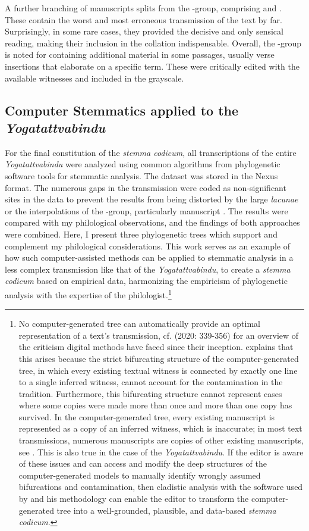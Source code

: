 A further branching of manuscripts splits from the \beta-group, comprising  and . These contain the worst and most erroneous transmission of the text by far. Surprisingly, in some rare cases, they provided the decisive and only sensical reading, making their inclusion in the collation indispensable. Overall, the \beta-group is noted for containing additional material in some passages, usually verse insertions that elaborate on a specific term. These were critically edited with the available witnesses and included in the grayscale.

\subsection{Computer Stemmatics applied to the \textit{Yogatattvabindu}}

For the final constitution of the \textit{stemma codicum}, all transcriptions of the entire \emph{Yogatattvabindu} were analyzed using common algorithms from phylogenetic software tools for stemmatic analysis. The dataset was stored in the Nexus format. The numerous gaps in the transmission were coded as non-significant sites in the data to prevent the results from being distorted by the large \textit{lacunae} or the interpolations of the \beta-group, particularly manuscript . The results were compared with my philological observations, and the findings of both approaches were combined. Here, I present three phylogenetic trees which support and complement my philological considerations. This work serves as an example of how such computer-assisted methods can be applied to stemmatic analysis in a less complex transmission like that of the \emph{Yogatattvabindu}, to create a \textit{stemma codicum} based on empirical data, harmonizing the empiricism of phylogenetic analysis with the expertise of the philologist.\footnote{No computer-generated tree can automatically provide an optimal representation of a text's transmission, cf. \citeauthor{baptiste2020} (2020: 339-356) for an overview of the criticism digital methods have faced since their inception. \citeauthor{maas2009stemma} explains that this arises because the strict bifurcating structure of the computer-generated tree, in which every existing textual witness is connected by exactly one line to a single inferred witness, cannot account for the contamination in the tradition. Furthermore, this bifurcating structure cannot represent cases where some copies were made more than once and more than one copy has survived. In the computer-generated tree, every existing manuscript is represented as a copy of an inferred witness, which is inaccurate; in most text transmissions, numerous manuscripts are copies of other existing manuscripts, see \citeauthor[2009: 80]{maas2009stemma}. This is also true in the case of the \emph{Yogatattvabindu}. If the editor is aware of these issues and can access and modify the deep structures of the computer-generated models to manually identify wrongly assumed bifurcations and contamination, then cladistic analysis with the software used by \citeauthor{maas2009stemma} and his methodology can enable the editor to transform the computer-generated tree into a well-grounded, plausible, and data-based \emph{stemma codicum}.}

